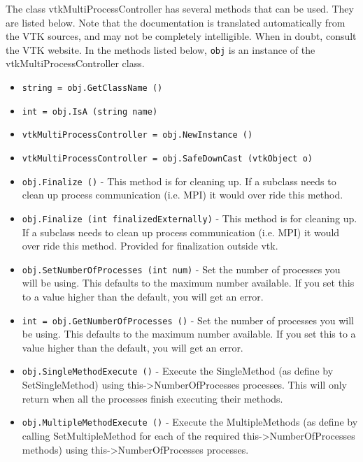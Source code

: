 The class vtkMultiProcessController has several methods that can be used.
  They are listed below.
Note that the documentation is translated automatically from the VTK sources,
and may not be completely intelligible.  When in doubt, consult the VTK website.
In the methods listed below, \verb|obj| is an instance of the vtkMultiProcessController class.
\begin{itemize}
\item  \verb|string = obj.GetClassName ()|

\item  \verb|int = obj.IsA (string name)|

\item  \verb|vtkMultiProcessController = obj.NewInstance ()|

\item  \verb|vtkMultiProcessController = obj.SafeDownCast (vtkObject o)|

\item  \verb|obj.Finalize ()| -  This method is for cleaning up.
 If a subclass needs to clean up process communication (i.e. MPI)
 it would over ride this method.

\item  \verb|obj.Finalize (int finalizedExternally)| -  This method is for cleaning up.
 If a subclass needs to clean up process communication (i.e. MPI)
 it would over ride this method.  Provided for finalization outside vtk.

\item  \verb|obj.SetNumberOfProcesses (int num)| -  Set the number of processes you will be using.  This defaults
 to the maximum number available.  If you set this to a value
 higher than the default, you will get an error.

\item  \verb|int = obj.GetNumberOfProcesses ()| -  Set the number of processes you will be using.  This defaults
 to the maximum number available.  If you set this to a value
 higher than the default, you will get an error.

\item  \verb|obj.SingleMethodExecute ()| -  Execute the SingleMethod (as define by SetSingleMethod) using
 this->NumberOfProcesses processes.  This will only return when
 all the processes finish executing their methods.

\item  \verb|obj.MultipleMethodExecute ()| -  Execute the MultipleMethods (as define by calling SetMultipleMethod
 for each of the required this->NumberOfProcesses methods) using
 this->NumberOfProcesses processes.


\end{itemize}

